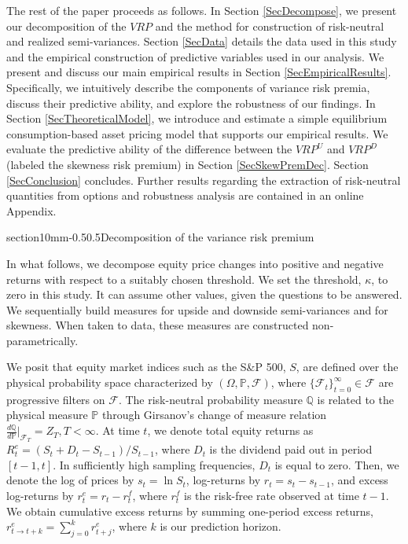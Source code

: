 \documentclass[11pt]{article}
\makeatletter
\renewcommand\section{\@startsection%
    {section}{1}{0mm}{-0.5\baselineskip}{0.5\baselineskip}{\bfseries\Large}}
\makeatother
\begin{document}
The rest of the paper proceeds as follows.  In Section \ref{SecDecompose}, we present our decomposition of the $VRP$ and the method for construction of risk-neutral and realized semi-variances. Section \ref{SecData} details the data used in this study and the empirical construction of predictive variables used in our analysis. We present and discuss our main empirical results in Section \ref{SecEmpiricalResults}. Specifically, we intuitively describe the components of variance risk premia, discuss their predictive ability, and explore the robustness of our findings. In Section \ref{SecTheoreticalModel}, we introduce and estimate a simple equilibrium consumption-based asset pricing model that supports our empirical results. We evaluate the predictive ability of the difference between the $VRP^{U}$ and $VRP^{D}$ (labeled the skewness risk premium) in Section \ref{SecSkewPremDec}. Section \ref{SecConclusion} concludes. Further results regarding the extraction of risk-neutral quantities from options and robustness analysis are contained in an online Appendix.


\section{Decomposition of the variance risk premium}\label{SecDecompose}

In what follows, we decompose equity price changes into positive and negative returns with respect to a suitably chosen threshold. We set the threshold, $\kappa$, to zero in this study. It can assume other values, given the questions to be answered. We sequentially build measures for upside and downside semi-variances and for skewness. When taken to data, these measures are constructed non-parametrically.

We posit that equity market indices such as the S\&P 500, $S$, are defined over the physical probability space characterized by $(\Omega, \mathbb{P}, \mathcal{F})$, where $\{\mathcal{F}_t\}_{t=0}^\infty\in\mathcal{F}$ are progressive filters on $\mathcal{F}$.  The risk-neutral probability measure $\mathbb{Q}$ is related to the physical measure $\mathbb{P}$ through Girsanov's change of measure relation $\frac{d\mathbb{Q}}{d\mathbb{P}}|_{\mathcal{F}_T}=Z_T, T<\infty$. At time $t$, we denote total equity returns as $R^e_t = (S_{t}+D_{t}-S_{t-1})/S_{t-1}$, where $D_t$ is the dividend paid out in period $[t-1, t]$. In sufficiently high sampling frequencies, $D_t$ is equal to zero. Then, we denote the log of prices by $s_t = \ln S_t$, log-returns by $r_t = s_t - s_{t-1}$, and excess log-returns by $r_t^{e} = r_t - r^f_t$, where $r^f_t$ is the risk-free rate observed at time $t-1$. We obtain cumulative excess returns by summing one-period excess returns, $r_{t\rightarrow t+k}^{e}=\sum^k_{j=0}r_{t+j}^{e}$, where $k$ is our prediction horizon.
\end{document}
